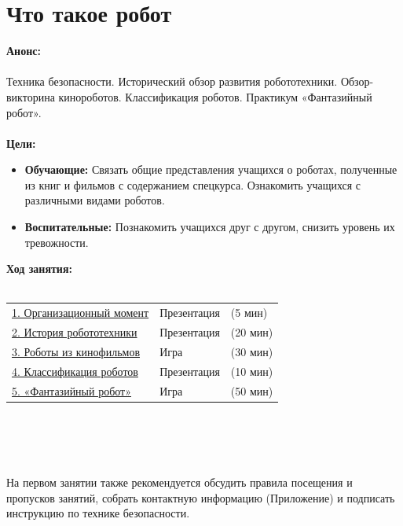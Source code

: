 \chapter{Что такое робот}
{\bfseries Анонс:}\\\\
Техника безопасности. Исторический обзор развития робототехники. Обзор-викторина кинороботов. Классификация роботов. Практикум «Фантазийный робот».\\\\
{\bfseries Цели:}
\begin{itemize}
	\item{}{\bfseries Обучающие:} Связать общие представления учащихся о роботах, полученные из книг и фильмов с содержанием спецкурса. Ознакомить учащихся с  различными видами роботов.
	\item{}{\bfseries Воспитательные:} Познакомить учащихся друг с другом, снизить уровень их тревожности.\\
\end{itemize}	
{\bfseries Ход занятия:}\\\\
\begin{tabular}{lll}
	\hyperlink{lesson1x1}{1. Организационный момент} & Презентация & (5 мин)\\
	\hyperlink{lesson1x2}{2. История робототехники} & Презентация & (20 мин) \\
	\hyperlink{lesson1x3}{3. Роботы из кинофильмов} & Игра & (30 мин) \\
	\hyperlink{lesson1x4}{4. Классификация роботов} & Презентация & (10 мин)\\
	\hyperlink{lesson1x5}{5. «Фантазийный робот»} & Игра & (50 мин)\\
\end{tabular}\\\\

{\hypertarget{lesson1x1}{}}\\\\

На первом занятии также рекомендуется обсудить правила посещения и пропусков занятий, собрать контактную информацию (Приложение) и подписать инструкцию по технике безопасности.\\\\

{\hypertarget{lesson1x2}{}}\\\\ 


